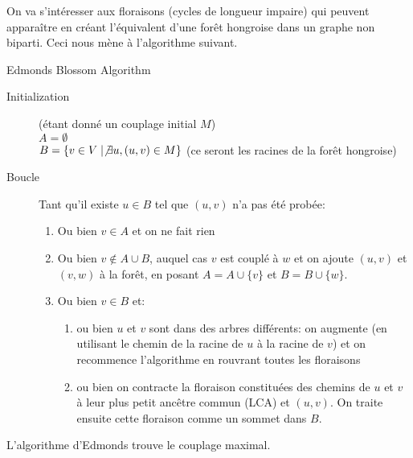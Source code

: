 \documentclass[math, info]{cours}
\begin{document}
On va s'intéresser aux floraisons (cycles de longueur impaire) qui peuvent apparaître en créant l'équivalent d'une forêt hongroise dans un graphe non biparti.
Ceci nous mène à l'algorithme suivant.
\begin{algorithm}
	\caption{Edmonds Blossom Algorithm}
	\begin{description}
		\item[Initialization] (étant donné un couplage initial $M$)\\
		      $A = \emptyset$\\
		      $B = \left\{v \in V\mid \not\exists u, (u, v)\in M \right\}$ (ce seront les racines de la forêt hongroise)\\
		\item[Boucle] Tant qu'il existe $u \in B$ tel que $(u, v)$ n'a pas été probée:
		      \begin{enumerate}
			      \item Ou bien $v \in A$ et on ne fait rien
			      \item Ou bien $v \notin A \cup B$, auquel cas $v$ est couplé à $w$ et on ajoute $(u, v)$ et $(v, w)$ à la forêt, en posant $A = A \cup \{v\}$ et $B = B \cup \{w\}$.
			      \item Ou bien $v \in B$ et:
			            \begin{enumerate}
				            \item ou bien $u$ et $v$ sont dans des arbres différents: on augmente (en utilisant le chemin de la racine de $u$ à la racine de $v$) et on recommence l'algorithme en rouvrant toutes les floraisons
				            \item ou bien on contracte la floraison constituées des chemins de $u$ et $v$ à leur plus petit ancêtre commun (LCA) et $(u, v)$.
				                  On traite ensuite cette floraison comme un sommet dans $B$.
			            \end{enumerate}
		      \end{enumerate}
	\end{description}
\end{algorithm}

\begin{thm}
	L'algorithme d'Edmonds trouve le couplage maximal.
	\label{thm:edmondsblossom}
\end{thm}
\end{document}
